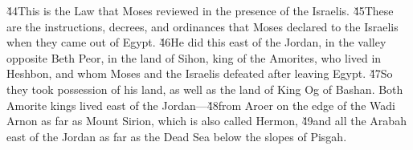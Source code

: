 \v{44}This is the Law that Moses reviewed in the presence of the Israelis. \v{45}These are the instructions, decrees, and ordinances that Moses declared to the Israelis when they came out of Egypt. \v{46}He did this east of the Jordan, in the valley opposite Beth Peor, in the land of Sihon, king of the Amorites, who lived in Heshbon, and whom Moses and the Israelis defeated after leaving Egypt. \v{47}So they took possession of his land, as well as the land of King Og of Bashan. Both Amorite kings lived east of the Jordan---\v{48}from Aroer on the edge of the Wadi Arnon as far as Mount Sirion, which is also called Hermon, \v{49}and all the Arabah east of the Jordan as far as the Dead Sea below the slopes of Pisgah.

